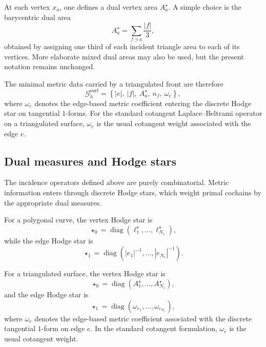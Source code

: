 \documentclass{article}
\begin{document}
At each vertex $x_a$, one defines a dual vertex area $A_a^\star$.
A simple choice is the barycentric dual area
\begin{equation}
A_a^\star
=
\sum_{f\ni a}\frac{|f|}{3},
\label{eq:barycentric_dual_area}
\end{equation}
obtained by assigning one third of each incident triangle area to each of its vertices.
More elaborate mixed dual areas may also be used, but the present notation remains unchanged.

The minimal metric data carried by a triangulated front are therefore
\begin{equation}
\mathcal{G}_h^{\mathrm{surf}}
=
\left\{
|e|,\ |f|,\ A_a^\star,\ n_f,\ \omega_e
\right\},
\label{eq:surface_metric_tuple}
\end{equation}
where $\omega_e$ denotes the edge-based metric coefficient entering the discrete
Hodge star on tangential $1$-forms. For the standard cotangent Laplace--Beltrami
operator on a triangulated surface, $\omega_e$ is the usual cotangent weight
associated with the edge $e$.

\subsection{Dual measures and Hodge stars}
\label{subsec:front_hodge}

The incidence operators defined above are purely combinatorial.
Metric information enters through discrete Hodge stars, which weight primal
cochains by the appropriate dual measures.

For a polygonal curve, the vertex Hodge star is
\begin{equation}
\star_0 = \operatorname{diag}\!\left(\ell_1^\star,\ldots,\ell_{N_v}^\star\right),
\label{eq:hodge0_curve}
\end{equation}
while the edge Hodge star is
\begin{equation}
\star_1 = \operatorname{diag}\!\left(|e_1|^{-1},\ldots,|e_{N_e}|^{-1}\right).
\label{eq:hodge1_curve}
\end{equation}

For a triangulated surface, the vertex Hodge star is
\begin{equation}
\star_0 = \operatorname{diag}\!\left(A_1^\star,\ldots,A_{N_v}^\star\right),
\label{eq:hodge0_surface}
\end{equation}
and the edge Hodge star is
\begin{equation}
\star_1 = \operatorname{diag}\!\left(\omega_{e_1},\ldots,\omega_{e_{N_e}}\right),
\label{eq:hodge1_surface}
\end{equation}
where $\omega_e$ denotes the edge-based metric coefficient associated with the
discrete tangential $1$-form on edge $e$. In the standard cotangent formulation,
$\omega_e$ is the usual cotangent weight.
\end{document}
